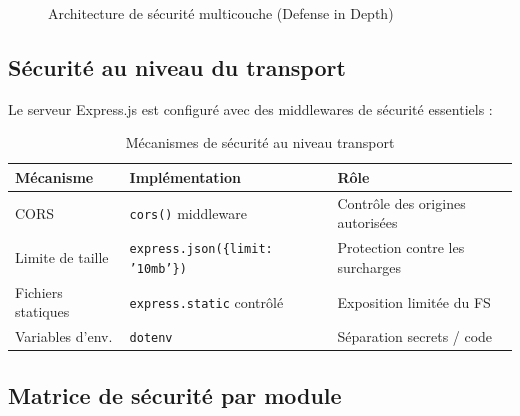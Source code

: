 \begin{figure}[H]
\centering
{}
\caption{Architecture de sécurité multicouche (Defense in Depth)}
\label{fig:security-layers}
\end{figure}

\subsection{Sécurité au niveau du transport}

Le serveur Express.js est configuré avec des middlewares de sécurité essentiels :

\begin{table}[H]
\centering
\caption{Mécanismes de sécurité au niveau transport}
\label{tab:transport-security}
\begin{tabular}{|l|l|l|}
\hline
\textbf{Mécanisme} & \textbf{Implémentation} & \textbf{Rôle} \\
\hline
CORS & \texttt{cors()} middleware & Contrôle des origines autorisées \\
\hline
Limite de taille & \texttt{express.json(\{limit: '10mb'\})} & Protection contre les surcharges \\
\hline
Fichiers statiques & \texttt{express.static} contrôlé & Exposition limitée du FS \\
\hline
Variables d'env. & \texttt{dotenv} & Séparation secrets / code \\
\hline
\end{tabular}
\end{table}

\subsection{Matrice de sécurité par module}

